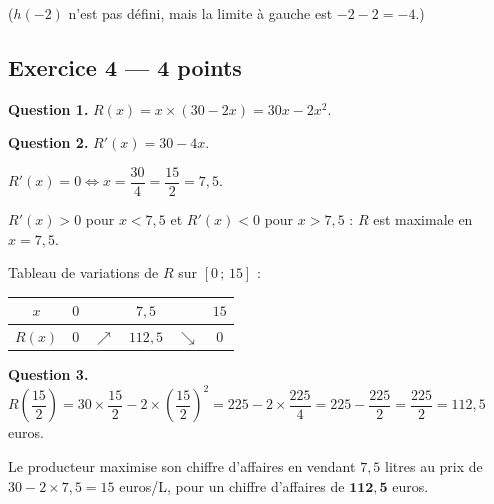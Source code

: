 ($h(-2)$ n'est pas défini, mais la limite à gauche est $-2 - 2 = -4$.)

\subsection*{Exercice 4 — 4 points}


\textbf{Question 1.}
$R(x) = x \times (30 - 2x) = 30x - 2x^2.$

\textbf{Question 2.}
$R'(x) = 30 - 4x.$

$R'(x) = 0 \Leftrightarrow x = \dfrac{30}{4} = \dfrac{15}{2} = 7{,}5.$

$R'(x) > 0$ pour $x < 7{,}5$ et $R'(x) < 0$ pour $x > 7{,}5$ : $R$ est maximale en $x = 7{,}5$.

Tableau de variations de $R$ sur $[0\,;\,15]$ :

\begin{center}
\begin{tabular}{|c|ccccc|}
\hline
$x$ & $0$ & & $7{,}5$ & & $15$ \\
\hline
$R(x)$ & $0$ & $\nearrow$ & $112{,}5$ & $\searrow$ & $0$ \\
\hline
\end{tabular}
\end{center}

\textbf{Question 3.}
$R\!\left(\dfrac{15}{2}\right) = 30 \times \dfrac{15}{2} - 2 \times \left(\dfrac{15}{2}\right)^2 = 225 - 2 \times \dfrac{225}{4} = 225 - \dfrac{225}{2} = \dfrac{225}{2} = 112{,}5$ euros.

Le producteur maximise son chiffre d'affaires en vendant $7{,}5$ litres au prix de $30 - 2 \times 7{,}5 = 15$ euros/L, pour un chiffre d'affaires de $\mathbf{112{,}5}$ euros.

